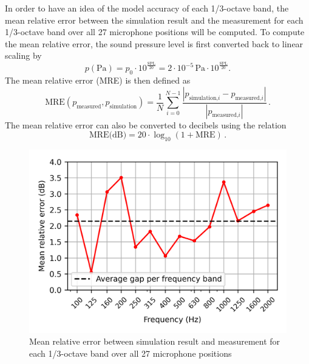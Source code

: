 In order to have an idea of the model accuracy of each 1/3-octave band, the mean relative error between the simulation result and the measurement for each 1/3-octave band over all 27 microphone positions will be computed. To compute the mean relative error, the sound pressure level is first converted back to linear scaling by
\begin{equation}
	p(\text{Pa}) = p_0 \cdot 10^{\frac{\text{SPL}}{20}} = 2\cdot10^{-5}\,\text{Pa} \cdot 10^{\frac{\text{SPL}}{20}}\text{.}
\end{equation}
The mean relative error (MRE) is then defined as
\begin{equation}
	\text{MRE}(p_{\text{measured}}, p_{\text{simulation}}) = \frac{1}{N} \sum_{i=0}^{N - 1} \frac{|p_{\text{simulation,}i} - p_{\text{measured,}i}|}{|p_{\text{measured,}i}|}\,.
\end{equation}
The mean relative error can also be converted to decibels using the relation
\begin{equation}
	\text{MRE(dB)} = 20\cdot\log_{10}(1 + \text{MRE})\,.
\end{equation}

\begin{figure}[H]
	\centering
	\includegraphics{fig/chap5/initial_model/freq_spectrum/average_gap.png}
	\caption{Mean relative error between simulation result and measurement for each 1/3-octave band over all 27 microphone positions}
	\label{fig:gap_freq_spectrum}
\end{figure}

